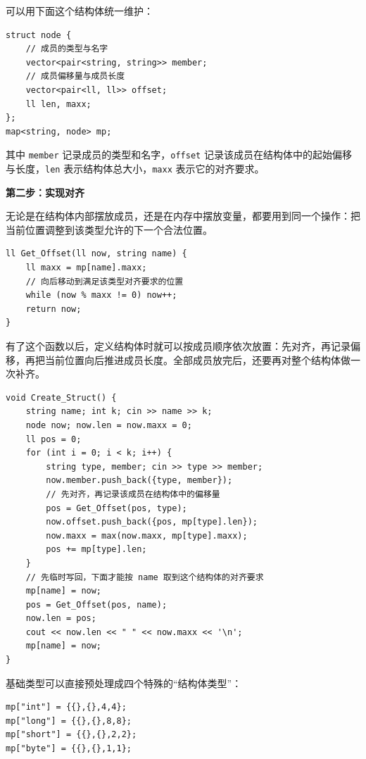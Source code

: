 \documentclass{book}
\newcommand{\code}[1]{\colorbox{codebg}{\texttt{#1}}}  %
\begin{document}
    可以用下面这个结构体统一维护：

    \begin{lstlisting}[style = code]
struct node {
    // 成员的类型与名字
    vector<pair<string, string>> member;
    // 成员偏移量与成员长度
    vector<pair<ll, ll>> offset;
    ll len, maxx;
};
map<string, node> mp;
    \end{lstlisting}

    其中 \code{member} 记录成员的类型和名字，\code{offset} 记录该成员在结构体中的起始偏移与长度，\code{len} 表示结构体总大小，\code{maxx} 表示它的对齐要求。

    \par\medskip
    \noindent\textbf{第二步：实现对齐}
    \par\medskip

    无论是在结构体内部摆放成员，还是在内存中摆放变量，都要用到同一个操作：把当前位置调整到该类型允许的下一个合法位置。

    \begin{lstlisting}[style = code]
ll Get_Offset(ll now, string name) {
    ll maxx = mp[name].maxx;
    // 向后移动到满足该类型对齐要求的位置
    while (now % maxx != 0) now++;
    return now;
}\end{lstlisting}

    有了这个函数以后，定义结构体时就可以按成员顺序依次放置：先对齐，再记录偏移，再把当前位置向后推进成员长度。全部成员放完后，还要再对整个结构体做一次补齐。

\newpage
    \begin{lstlisting}[style = code]
void Create_Struct() {
    string name; int k; cin >> name >> k;
    node now; now.len = now.maxx = 0;
    ll pos = 0;
    for (int i = 0; i < k; i++) {
        string type, member; cin >> type >> member;
        now.member.push_back({type, member});
        // 先对齐，再记录该成员在结构体中的偏移量
        pos = Get_Offset(pos, type);
        now.offset.push_back({pos, mp[type].len});
        now.maxx = max(now.maxx, mp[type].maxx);
        pos += mp[type].len;
    }
    // 先临时写回，下面才能按 name 取到这个结构体的对齐要求
    mp[name] = now;
    pos = Get_Offset(pos, name);
    now.len = pos;
    cout << now.len << " " << now.maxx << '\n';
    mp[name] = now;
}\end{lstlisting}

    基础类型可以直接预处理成四个特殊的“结构体类型”：

    \begin{lstlisting}[style = code]
mp["int"] = {{},{},4,4};
mp["long"] = {{},{},8,8};
mp["short"] = {{},{},2,2};
mp["byte"] = {{},{},1,1};\end{lstlisting}
\end{document}
